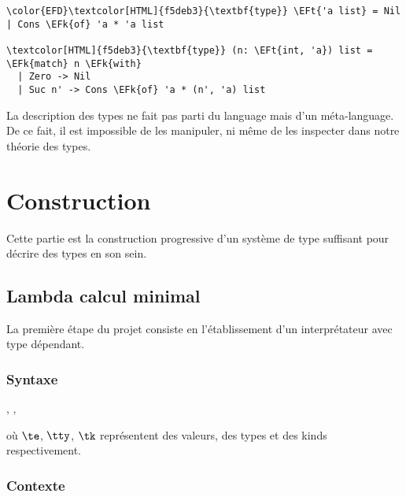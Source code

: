 \documentclass[11pt]{article}
\newcommand{\EFk}[1]{\textcolor{EFk}{#1}} %
\newcommand{\EFt}[1]{\textcolor{EFt}{#1}} %
\begin{document}
\begin{Code}
\begin{Verbatim}
\color{EFD}\textcolor[HTML]{f5deb3}{\textbf{type}} \EFt{'a list} = Nil | Cons \EFk{of} 'a * 'a list

\textcolor[HTML]{f5deb3}{\textbf{type}} (n: \EFt{int, 'a}) list = \EFk{match} n \EFk{with}
  | Zero -> Nil
  | Suc n' -> Cons \EFk{of} 'a * (n', 'a) list
\end{Verbatim}
\end{Code}

La description des types ne fait pas parti du language mais d'un méta-language. De ce fait, il est impossible de les manipuler, ni même de les inspecter dans notre théorie des types.

\section{Construction}
\label{sec:org08c626d}

Cette partie est la construction progressive d'un système de type suffisant pour décrire des types en son sein.

\subsection{Lambda calcul minimal}
\label{sec:org877343a}

La première étape du projet consiste en l'établissement d'un interprétateur avec type dépendant.

\subsubsection{Syntaxe}
\label{sec:org6a1a0f8}

\begin{decl}{\te, \tty, \tk}
\end{decl}


où \(\te\), \(\tty\), \(\tk\) représentent des valeurs, des types et des kinds respectivement.

\subsubsection{Contexte}
\label{sec:org171064d}
\end{document}

